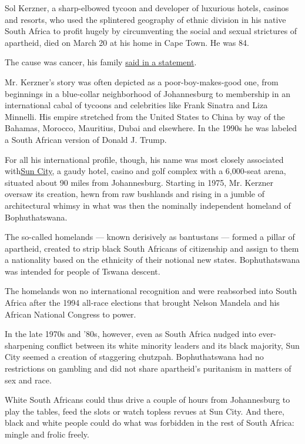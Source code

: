 Sol Kerzner, a sharp-elbowed tycoon and developer of luxurious hotels,
casinos and resorts, who used the splintered geography of ethnic
division in his native South Africa to profit hugely by circumventing
the social and sexual strictures of apartheid, died on March 20 at his
home in Cape Town. He was 84.

The cause was cancer, his family
\href{https://www.prnewswire.com/in/news-releases/sol-kerzner-1935-2020-visionary-south-african-hotelier-left-an-indelible-mark-on-the-global-hospitality-industry-897064696.html}{said
in a statement}.

Mr. Kerzner's story was often depicted as a poor-boy-makes-good one,
from beginnings in a blue-collar neighborhood of Johannesburg to
membership in an international cabal of tycoons and celebrities like
Frank Sinatra and Liza Minnelli. His empire stretched from the United
States to China by way of the Bahamas, Morocco, Mauritius, Dubai and
elsewhere. In the 1990s he was labeled a South African version of Donald
J. Trump.

For all his international profile, though, his name was most closely
associated with\href{https://www.sun-city-south-africa.com/}{Sun City},
a gaudy hotel, casino and golf complex with a 6,000-seat arena, situated
about 90 miles from Johannesburg. Starting in 1975, Mr. Kerzner oversaw
its creation, hewn from raw bushlands and rising in a jumble of
architectural whimsy in what was then the nominally independent homeland
of Bophuthatswana.

The so-called homelands --- known derisively as bantustans --- formed a
pillar of apartheid, created to strip black South Africans of
citizenship and assign to them a nationality based on the ethnicity of
their notional new states. Bophuthatswana was intended for people of
Tswana descent.

The homelands won no international recognition and were reabsorbed into
South Africa after the 1994 all-race elections that brought Nelson
Mandela and his African National Congress to power.

In the late 1970s and '80s, however, even as South Africa nudged into
ever-sharpening conflict between its white minority leaders and its
black majority, Sun City seemed a creation of staggering chutzpah.
Bophuthatswana had no restrictions on gambling and did not share
apartheid's puritanism in matters of sex and race.

White South Africans could thus drive a couple of hours from
Johannesburg to play the tables, feed the slots or watch topless revues
at Sun City. And there, black and white people could do what was
forbidden in the rest of South Africa: mingle and frolic freely.

